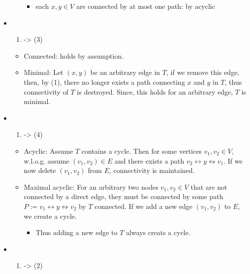 \documentclass[
]{article}
\providecommand{\tightlist}{%
  \setlength{\itemsep}{0pt}\setlength{\parskip}{0pt}}
\begin{document}
\begin{itemize}
\begin{itemize}
    \begin{itemize}
    \tightlist
    \item
      each \(x,y \in V\) are connected by at most one path: by acyclic
    \end{itemize}
  \end{itemize}
\item
  \begin{enumerate}
  \def\labelenumi{(\arabic{enumi})}
  \tightlist
  \item
    -\textgreater{} (3)
  \end{enumerate}

  \begin{itemize}
  \tightlist
  \item
    Connected: holds by assumption.
  \item
    Minimal: Let \((x,y)\) be an arbitrary edge in \(T\), if we remove
    this edge, then, by (1), there no longer exists a path connecting
    \(x\) and \(y\) in \(T\), thus connectivity of \(T\) is destroyed.
    Since, this holds for an arbitrary edge, \(T\) is minimal.
  \end{itemize}
\item
  \begin{enumerate}
  \def\labelenumi{(\arabic{enumi})}
  \setcounter{enumi}{2}
  \tightlist
  \item
    -\textgreater{} (4)
  \end{enumerate}

  \begin{itemize}
  \tightlist
  \item
    Acyclic: Assume \(T\) contains a cycle. Then for some vertices
    \(v_1,v_2 \in V\), w.l.o.g. assume \((v_1,v_2) \in E\) and there
    exists a path \(v_2 \leftrightarrow y \leftrightsquigarrow v_1\). If
    we now delete \((v_1,v_2)\) from \(E\), connectivity is maintained.
  \item
    Maximal acyclic: For an arbitrary two nodes \(v_1,v_2 \in V\) that
    are not connected by a direct edge, they must be connected by some
    path \(P := v_1 \leftrightarrow y \leftrightsquigarrow v_2\) by
    \(T\) connected. If we add a new edge \((v_1,v_2)\) to \(E\), we
    create a cycle.

    \begin{itemize}
    \tightlist
    \item
      Thus adding a new edge to \(T\) always creats a cycle.
    \end{itemize}
  \end{itemize}
\item
  \begin{enumerate}
  \def\labelenumi{(\arabic{enumi})}
  \setcounter{enumi}{3}
  \tightlist
  \item
    -\textgreater{} (2)
  \end{enumerate}


\end{itemize}
\end{document}
